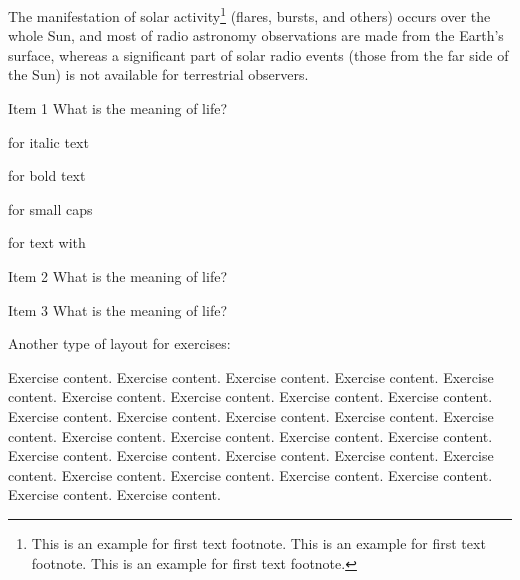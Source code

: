 \noindent
The manifestation of solar activity\footnote{This is an example for first text footnote. This is an example for first text footnote. This is an example for first text footnote.} (flares, bursts, and others) occurs over the whole Sun, and most of radio astronomy observations are made from the Earth's surface, whereas a significant part of solar radio events (those from the far side of the Sun) is not available for terrestrial observers.

\begin{exercises}[Exercises]

\item \label{3a} Item 1 What is the meaning of life?


\begin{exercise}
\item for italic text
\item for bold text 
\item for small caps
\item for text with 
\end{exercise}

\item Item 2 What is the meaning of life?




\item Item 3 What is the meaning of life?

\end{exercises}

\noindent Another type of layout for exercises:

\begin{exer}
Exercise content. Exercise content. Exercise content. Exercise content. Exercise content. Exercise content. Exercise content. Exercise content. Exercise content. Exercise content.  Exercise content. Exercise content. Exercise content. Exercise content. Exercise content. Exercise content. Exercise content. Exercise content. Exercise content. Exercise content. Exercise content. Exercise content. Exercise content. Exercise content. Exercise content. Exercise content. Exercise content. Exercise content. Exercise content.

\end{exer}

